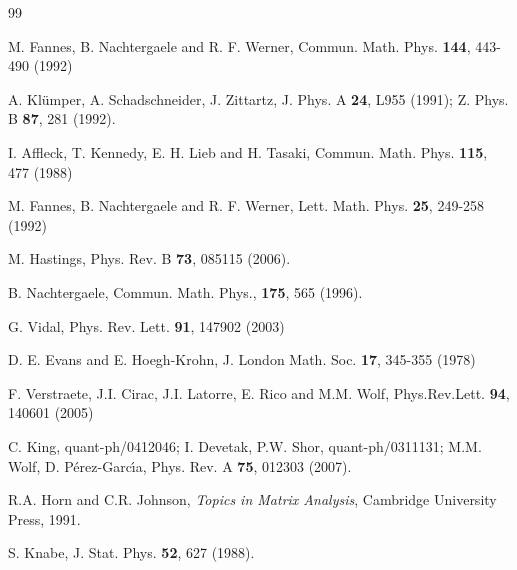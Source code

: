\documentclass[aps,prl,epsfig,graphics,floatfix,mathbbm,a4paper]{article}
\newcommand{\1}{\mathbbm{1}}
\renewcommand{\>}{\rangle}
\newcommand{\<}{\langle}
\begin{document}
\begin{thebibliography}{99}

     M. Fannes, B.
    Nachtergaele and R. F. Werner, Commun. Math. Phys. \textbf{144},
    443-490 (1992)

     A. Kl\"umper, A. Schadschneider, J. Zittartz, J. Phys. A {\bf 24},
    L955 (1991); Z. Phys. B {\bf 87}, 281 (1992).

    I. Affleck, T. Kennedy, E. H. Lieb and H. Tasaki, Commun. Math.
    Phys. \textbf{115}, 477 (1988)

    M. Fannes, B. Nachtergaele and R. F. Werner, Lett. Math. Phys.
    \textbf{25}, 249-258 (1992)

     M. Hastings, Phys. Rev. B {\bf 73}, 085115 (2006).

     B. Nachtergaele, Commun. Math. Phys., {\bf 175}, 565
    (1996).

    G. Vidal, Phys. Rev. Lett. \textbf{91}, 147902 (2003)

    D. E. Evans and E. Hoegh-Krohn, J. London Math. Soc. \textbf{17},
    345-355 (1978)

    F. Verstraete, J.I. Cirac, J.I. Latorre, E. Rico and M.M. Wolf,
    Phys.Rev.Lett. \textbf{94}, 140601 (2005)

     C. King, quant-ph/0412046; I. Devetak, P.W. Shor,
    quant-ph/0311131; M.M. Wolf, D. P\'{e}rez-Garc{\'{\i}}a, Phys.
    Rev. A {\bf 75}, 012303 (2007).


    R.A. Horn and C.R. Johnson, \emph{Topics in Matrix Analysis},
    Cambridge University Press, 1991.


    S. Knabe, J. Stat. Phys.  \textbf{52}, 627 (1988).


\end{thebibliography}
\end{document}
